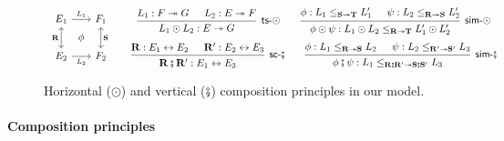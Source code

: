\documentclass[acmsmall,nonacm]{acmart}
\newcommand{\kw}[1]{\ensuremath{ \mathsf{#1} }}
\newcommand{\vcomp}{\fatsemi}
\begin{document}
\begin{figure} %
  \[
  \begin{array}{c}
    \begin{tikzcd}[sep=0.5ex]
      E_1 \ar[dd, leftrightarrow, "\mathbf{R}"']
	  \ar[rr, "L_1"] &&
      F_1 \ar[dd, leftrightarrow, "\mathbf{S}"] \\
      & \phi & \\
      E_2 \ar[rr, "L_2"'] &&
      F_2
    \end{tikzcd}
  \end{array}
  \quad
  \begin{array}{c}
    \begin{prooftree}
      \hypo{L_1 : F \twoheadrightarrow G}
      \hypo{L_2 : E \twoheadrightarrow F}
      \infer2[\kw{ts}-$\odot$]{L_1 \odot L_2 : E \twoheadrightarrow G}
    \end{prooftree}
    \qquad
    \begin{prooftree}
      \hypo{\phi: L_1 \le_{\mathbf{S} \twoheadrightarrow \mathbf{T}} L_1'}
      \hypo{\psi: L_2 \le_{\mathbf{R} \twoheadrightarrow \mathbf{S}} L_2'}
      \infer2[\kw{sim}-$\odot$]{\phi \odot \psi :
	L_1 \odot L_2 \le_{\mathbf{R} \twoheadrightarrow \mathbf{T}} L_1' \odot L_2'}
    \end{prooftree}
    \\[1.5em]
    \begin{prooftree}
      \hypo{\mathbf{R} : E_1 \leftrightarrow E_2}
      \hypo{\mathbf{R}' : E_2 \leftrightarrow E_3}
      \infer2[\kw{sc}-$\vcomp$]{\mathbf{R} \vcomp \mathbf{R}' : E_1 \leftrightarrow E_3}
    \end{prooftree}
    \qquad
    \begin{prooftree}
      \hypo{\phi : L_1 \le_{\mathbf{R} \twoheadrightarrow \mathbf{S}} L_2}
      \hypo{\psi : L_2 \le_{\mathbf{R'} \twoheadrightarrow \mathbf{S'}} L_3}
      \infer2[\kw{sim}-$\vcomp$]{\phi \vcomp \psi : L_1 \le_{\mathbf{R} \vcomp \mathbf{R'} \twoheadrightarrow
	\mathbf{S} \vcomp \mathbf{S'}} L_3}
    \end{prooftree}
  \end{array}
\]
  \caption{Horizontal ($\odot$) and vertical ($\vcomp$)
    composition principles in our model.}
  \label{fig:hvcomp}
\end{figure}

\paragraph{Composition principles} %
\end{document}
